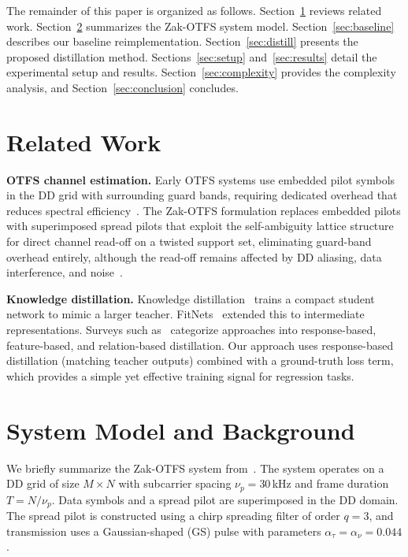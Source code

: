 \documentclass[conference]{IEEEtran}
\begin{document}
The remainder of this paper is organized as follows. Section~\ref{sec:related} reviews related work. Section~\ref{sec:system} summarizes the Zak-OTFS system model. Section~\ref{sec:baseline} describes our baseline reimplementation. Section~\ref{sec:distill} presents the proposed distillation method. Sections~\ref{sec:setup} and~\ref{sec:results} detail the experimental setup and results. Section~\ref{sec:complexity} provides the complexity analysis, and Section~\ref{sec:conclusion} concludes.

\section{Related Work}
\label{sec:related}

\textbf{OTFS channel estimation.}
Early OTFS systems use embedded pilot symbols in the DD grid with surrounding guard bands, requiring dedicated overhead that reduces spectral efficiency~\cite{raviteja2019otfs}. The Zak-OTFS formulation replaces embedded pilots with superimposed spread pilots that exploit the self-ambiguity lattice structure for direct channel read-off on a twisted support set, eliminating guard-band overhead entirely, although the read-off remains affected by DD aliasing, data interference, and noise~\cite{zakotfs2024}.

\textbf{Knowledge distillation.}
Knowledge distillation~\cite{hinton2015distilling, buciluamodel2006} trains a compact student network to mimic a larger teacher. FitNets~\cite{romero2014fitnets} extended this to intermediate representations. Surveys such as~\cite{gou2021kd_survey} categorize approaches into response-based, feature-based, and relation-based distillation. Our approach uses response-based distillation (matching teacher outputs) combined with a ground-truth loss term, which provides a simple yet effective training signal for regression tasks.

\section{System Model and Background}
\label{sec:system}

We briefly summarize the Zak-OTFS system from~\cite{zakotfs2024}. The system operates on a DD grid of size $M \times N$ with subcarrier spacing $\nu_p = 30$\,kHz and frame duration $T = N / \nu_p$. Data symbols and a spread pilot are superimposed in the DD domain. The spread pilot is constructed using a chirp spreading filter of order $q = 3$, and transmission uses a Gaussian-shaped (GS) pulse with parameters $\alpha_\tau = \alpha_\nu = 0.044$.
\end{document}
